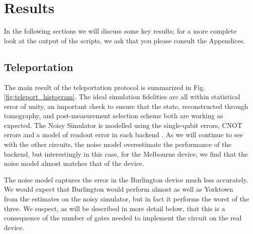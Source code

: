 \section{Results} In the following sections we will discuss some key results;
for a more complete look at the output of the scripts, we ask that you please
consult the Appendices.

\subsection{Teleportation} The main result of the teleportation protocol is
summarized in Fig. \ref{fig:teleport_histogram}. The ideal simulation fidelities
are all within statistical error of unity, an important check to ensure that the
state, reconstructed through tomography, and post-measurement selection scheme
both are working as expected. The Noisy Simulator is modelled using the
single-qubit errors, CNOT errors and a model of readout error in each backend
\cite{qiskit_org}. As we will continue to see with the other circuits, the noise
model overestimate the performance of the backend, but interestingly in this
case, for the Melbourne device, we find that the noise model almost matches that
of the device.

The noise model captures the error in the Burlington device much less
accurately. We would expect that Burlington would perform almost as well as
Yorktown from the estimates on the noisy simulator, but in fact it performs the
worst of the three. We suspect, as will be described in more detail below, that
this is a consequence of the number of gates needed to implement the circuit on
the real device.

